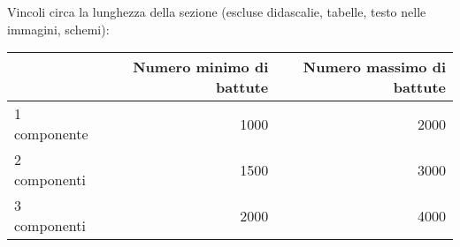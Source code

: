 Vincoli circa la lunghezza della sezione (escluse didascalie, tabelle, testo nelle immagini, schemi):

\vspace{1cm}
\begin{tabular}{l|rr}
 & Numero minimo di battute & Numero massimo di battute \\
 \hline
 1 componente & 1000 & 2000 \\
 2 componenti & 1500 & 3000 \\
 3 componenti & 2000 & 4000 \\
 \hline
\end{tabular}

\newpage